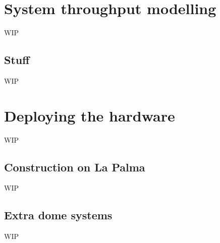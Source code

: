 \section{System throughput modelling}
\label{sec:throughput}
\begin{colsection}


\begin{colsection}

WIP

\end{colsection}

\subsection{Stuff}
\label{sec:stuff}
\begin{colsection}

WIP

\end{colsection}


\end{colsection}


\newpage
\section{Deploying the hardware}
\label{sec:hardware}
\begin{colsection}


\begin{colsection}

WIP

\end{colsection}


\subsection{Construction on La Palma}
\label{sec:construction}
\begin{colsection}

WIP

\end{colsection}


\subsection{Extra dome systems}
\label{sec:arduino}
\begin{colsection}

WIP

\end{colsection}


\end{colsection}

